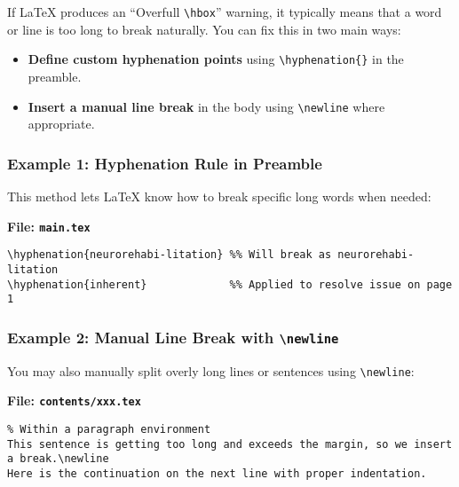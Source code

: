 \begin{subparagraph}
If LaTeX produces an ``Overfull \verb|\hbox|'' warning, it typically means that a word or line is too long to break naturally. You can fix this in two main ways:
\end{subparagraph}

\begin{itemize}[leftmargin=\subparitemindent]
  \item \textbf{Define custom hyphenation points} using \verb|\hyphenation{}| in the preamble.
  \item \textbf{Insert a manual line break} in the body using \verb|\newline| where appropriate.
\end{itemize}

\subsubsection{Example 1: Hyphenation Rule in Preamble}
\begin{subparagraph}
This method lets LaTeX know how to break specific long words when needed:
\end{subparagraph}

\noindent\textbf{File: \texttt{main.tex}}\vspace{-1em}
\begin{verbatim}
\hyphenation{neurorehabi-litation} %% Will break as neurorehabi-litation
\hyphenation{inherent}             %% Applied to resolve issue on page 1
\end{verbatim}

\subsubsection{Example 2: Manual Line Break with \texttt{\textbackslash newline}}
\begin{subparagraph}
You may also manually split overly long lines or sentences using \verb|\newline|:
\end{subparagraph}

\noindent\textbf{File: \texttt{contents/xxx.tex}}\vspace{-1em}
\begin{verbatim}
% Within a paragraph environment
This sentence is getting too long and exceeds the margin, so we insert a break.\newline
Here is the continuation on the next line with proper indentation.
\end{verbatim}

